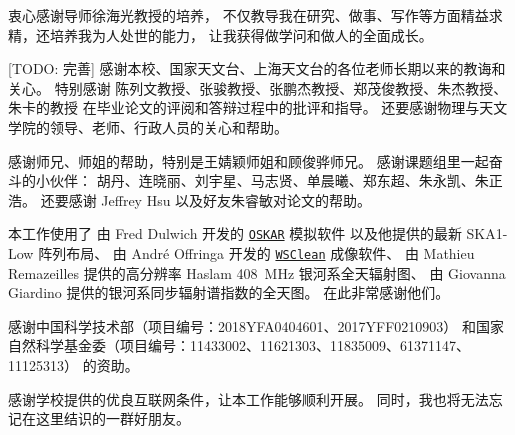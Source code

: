 
\begin{thanks}

衷心感谢导师徐海光教授的培养，
不仅教导我在研究、做事、写作等方面精益求精，还培养我为人处世的能力，
让我获得做学问和做人的全面成长。

[TODO: 完善]
感谢本校、国家天文台、上海天文台的各位老师长期以来的教诲和关心。
特别感谢
陈列文教授、张骏教授、张鹏杰教授、郑茂俊教授、朱杰教授、朱卡的教授
在毕业论文的评阅和答辩过程中的批评和指导。
还要感谢物理与天文学院的领导、老师、行政人员的关心和帮助。

感谢师兄、师姐的帮助，特别是王婧颖师姐和顾俊骅师兄。
感谢课题组里一起奋斗的小伙伴：
胡丹、连晓丽、刘宇星、马志贤、单晨曦、郑东超、朱永凯、朱正浩。
还要感谢 Jeffrey Hsu 以及好友朱睿敏对论文的帮助。

本工作使用了
由 Fred Dulwich 开发的
\href{https://github.com/OxfordSKA/OSKAR}{\texttt{OSKAR}} 模拟软件
以及他提供的最新 SKA1-Low 阵列布局、
由 André Offringa 开发的
\href{https://sourceforge.net/projects/wsclean/}{\texttt{WSClean}} 成像软件、
由 Mathieu Remazeilles 提供的高分辨率 Haslam \SI{408}{\MHz} 银河系全天辐射图、
由 Giovanna Giardino 提供的银河系同步辐射谱指数的全天图。
在此非常感谢他们。

感谢中国科学技术部（项目编号：2018YFA0404601、2017YFF0210903）
和国家自然科学基金委（项目编号：11433002、11621303、11835009、61371147、11125313）
的资助。

感谢学校提供的优良互联网条件，让本工作能够顺利开展。
同时，我也将无法忘记在这里结识的一群好朋友。


\end{thanks}
